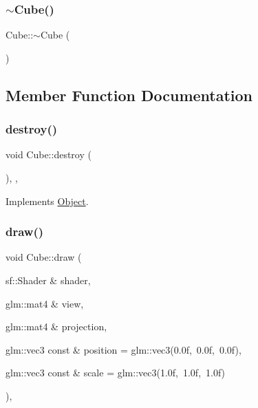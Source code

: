 \mbox{\label{classCube_a50a1ee10578a47a093c11e5d97ed4a29}} 
\subsubsection{\texorpdfstring{$\sim$\+Cube()}{~Cube()}}
{\footnotesize\ttfamily Cube\+::$\sim$\+Cube (\begin{DoxyParamCaption}{ }\end{DoxyParamCaption})\hspace{0.3cm}{\ttfamily [override]}}



\subsection{Member Function Documentation}
\mbox{\label{classCube_af4873f0863ce7ad4f37e4af154782a27}} 
\subsubsection{\texorpdfstring{destroy()}{destroy()}}
{\footnotesize\ttfamily void Cube\+::destroy (\begin{DoxyParamCaption}{ }\end{DoxyParamCaption})\hspace{0.3cm}{\ttfamily [override]}, {\ttfamily [protected]}, {\ttfamily [virtual]}}



Implements \hyperlink{classObject_a69e91bef2c9f048aa4509329dc44948e}{Object}.

\mbox{\label{classCube_a0dfc84b5634e8c3f0fefd3482085e855}} 
\subsubsection{\texorpdfstring{draw()}{draw()}}
{\footnotesize\ttfamily void Cube\+::draw (\begin{DoxyParamCaption}\item[{sf\+::\+Shader \&}]{shader,  }\item[{glm\+::mat4 \&}]{view,  }\item[{glm\+::mat4 \&}]{projection,  }\item[{glm\+::vec3 const \&}]{position = {\ttfamily glm\+:\+:vec3(0.0f,~0.0f,~0.0f)},  }\item[{glm\+::vec3 const \&}]{scale = {\ttfamily glm\+:\+:vec3(1.0f,~1.0f,~1.0f)} }\end{DoxyParamCaption})\hspace{0.3cm}{\ttfamily [override]}, {\ttfamily [virtual]}}



